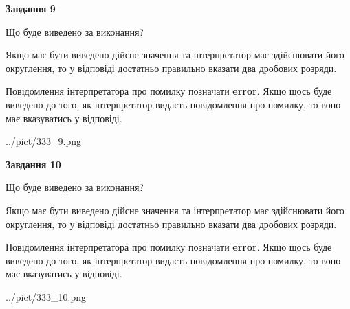 \documentclass[12pt, ukrainian]{article}
\begin{document}
{\begin {Large}
{\begin {center}\textbf{Завдання 9}\end {center}}\par
Що буде виведено за виконання? \par

Якщо має бути виведено дійсне значення та інтерпретатор має здійснювати його округлення, 
то у відповіді достатньо правильно вказати два дробових розряди.

Повідомлення інтерпретатора про помилку позначати \textbf{error}.
Якщо щось буде виведено до того, як інтерпретатор видасть повідомлення про помилку, 
то воно має вказуватись у відповіді. \par

\begin{center}
	{../pict/333_9.png}
\end{center}
\newpage

{\begin {center}\textbf{Завдання 10}\end {center}}\par
Що буде виведено за виконання? \par

Якщо має бути виведено дійсне значення та інтерпретатор має здійснювати його округлення, 
то у відповіді достатньо правильно вказати два дробових розряди.

Повідомлення інтерпретатора про помилку позначати \textbf{error}.
Якщо щось буде виведено до того, як інтерпретатор видасть повідомлення про помилку, 
то воно має вказуватись у відповіді. \par

\begin{center}
	{../pict/333_10.png}
\end{center}
\newpage

\end {Large}}
\end{document}
